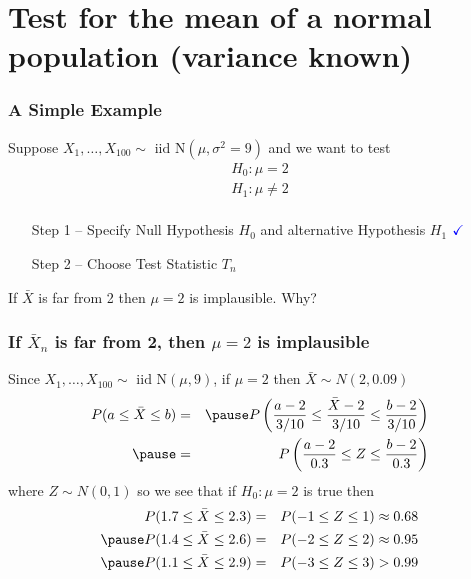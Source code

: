 \section{Test for the mean of a normal population (variance known)}
\begin{frame}
  \frametitle{A Simple Example}
  
  Suppose $X_1, \dots, X_{100} \sim \mbox{ iid N}(\mu, \sigma^2 = 9)$ and we want to test
  \[
    \begin{array}{c}
      H_0\colon \mu = 2\\
      H_1\colon \mu \neq 2\\
    \end{array}
  \]

  \pause

  \begin{enumerate}
    \item[Step 1] -- Specify Null Hypothesis $H_0$ and alternative Hypothesis $H_1$ $\textcolor{blue}{\checkmark}$\pause
    \item[Step 2] -- \alert{Choose Test Statistic $T_n$}
  \end{enumerate}

  \pause

  If $\bar{X}$ is far from 2 then $\mu=2$ is implausible. Why?

\end{frame}
\begin{frame}
  \frametitle{If $\bar{X}_n$ is far from 2, then $\mu = 2$ is implausible}

  Since $X_1, \dots, X_{100} \sim \mbox{ iid N}(\mu, 9)$, \alert{if $\mu = 2$ then $\bar{X} \sim N(2, 0.09)$}
  \begin{eqnarray*}
     P(a \leq \bar{X} \leq b) &=& \pause P\left(\frac{a - 2}{3/10} \leq \frac{\bar{X}-2}{3/10} \leq \frac{b - 2}{3/10} \right)\\ \pause
     &=& P\left( \frac{a-2}{0.3} \leq Z \leq \frac{b-2}{0.3} \right)
  \end{eqnarray*}
  where $Z \sim N(0,1)$ so we see that if $H_0\colon \mu = 2$ is true then \pause
  \begin{eqnarray*}
    P(1.7 \leq \bar{X} \leq 2.3) &=& P(-1 \leq Z \leq 1) \approx 0.68\\ \pause
    P(1.4 \leq \bar{X} \leq 2.6) &=& P(-2 \leq Z \leq 2) \approx 0.95 \\ \pause
    P(1.1 \leq \bar{X} \leq 2.9) &=& P(-3 \leq Z \leq 3) > 0.99 
  \end{eqnarray*}

\end{frame}
